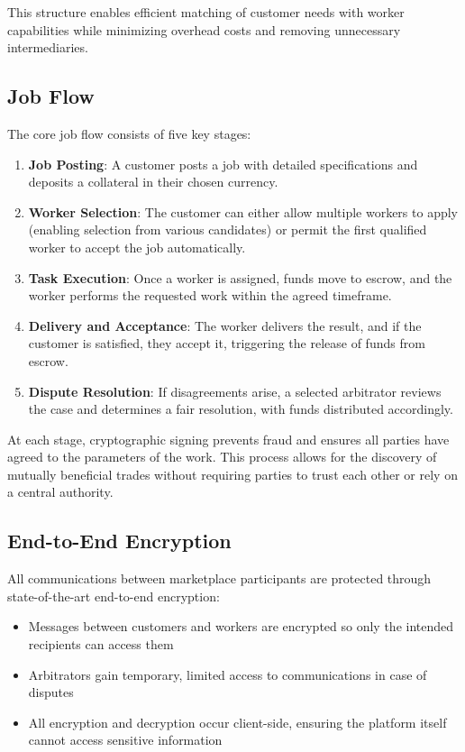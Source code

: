 \documentclass{article}
\begin{document}
This structure enables efficient matching of customer needs with worker capabilities while minimizing overhead costs and removing unnecessary intermediaries.

\subsection{Job Flow}

The core job flow consists of five key stages:

\begin{enumerate}
    \item \textbf{Job Posting}: A customer posts a job with detailed specifications and deposits a collateral in their chosen currency.
    
    \item \textbf{Worker Selection}: The customer can either allow multiple workers to apply (enabling selection from various candidates) or permit the first qualified worker to accept the job automatically.
    
    \item \textbf{Task Execution}: Once a worker is assigned, funds move to escrow, and the worker performs the requested work within the agreed timeframe.
    
    \item \textbf{Delivery and Acceptance}: The worker delivers the result, and if the customer is satisfied, they accept it, triggering the release of funds from escrow.
    
    \item \textbf{Dispute Resolution}: If disagreements arise, a selected arbitrator reviews the case and determines a fair resolution, with funds distributed accordingly.
\end{enumerate}

At each stage, cryptographic signing prevents fraud and ensures all parties have agreed to the parameters of the work. This process allows for the discovery of mutually beneficial trades without requiring parties to trust each other or rely on a central authority.

\subsection{End-to-End Encryption}

All communications between marketplace participants are protected through state-of-the-art end-to-end encryption:

\begin{itemize}
    \item Messages between customers and workers are encrypted so only the intended recipients can access them
    \item Arbitrators gain temporary, limited access to communications in case of disputes
    \item All encryption and decryption occur client-side, ensuring the platform itself cannot access sensitive information
\end{itemize}
\end{document}
